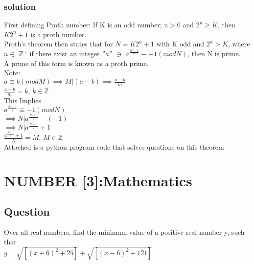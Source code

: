 \documentclass{article}
\begin{document}
\subsubsection{solution}
First defining Proth number: 
If K is an odd number; n$>0$ and $2^{n}\geq K$, then $K2^{n}+1$ is a proth number.\\ 
Proth's theorem then states that for $N=K2^{n}+1$ with K odd and $2^{n}>K$, where $n \in$ $\mathbb{Z}^{+}$ if there exist an integer $"a"$ $\ni$ $\displaystyle a^{\frac{N-1}{2}}\equiv -1(modN)$, then N is prime.\\
A prime of this form is known as a proth prime.\\
Note:\\
$a\equiv b(modM)\implies M|(a-b)\implies \frac{a-b}{m}$\\
$\frac{a-b}{m}=k$, $k\in\mathbb{Z}$\\
This Implies\\
$\displaystyle a^{\frac{N-1}{2}}\equiv-1(modN)$\\
$\implies N|a^{\frac{N-1}{2}}-(-1)$\\
$\implies N|a^{\frac{N-1}{2}}+1$\\
$\frac{a^{\frac{N-1}{2}}+1}{N}=M$, $M\in\mathbb{Z}$\\
Attached is a python program code that solves questions on this theorem\\

\section{NUMBER [3]:Mathematics }
\subsection{Question}
Over all real numbers, find the minimum value of a positive real number y, such that \\
$ \displaystyle y=\sqrt{[(x+6)^{2}+25]}+\sqrt{[(x-6)^{2}+121]}$ \\
\end{document}
